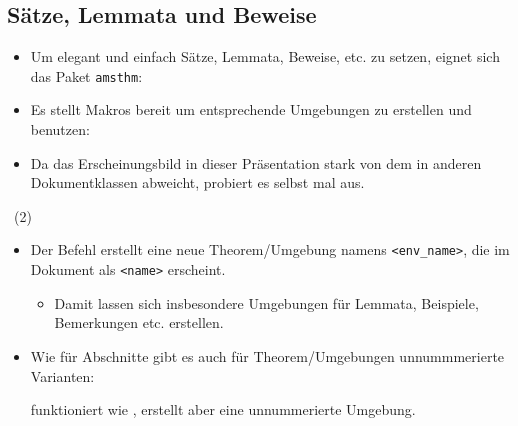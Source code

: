 \subsection{Sätze, Lemmata und Beweise}

\begin{frame}{\subsecname}
    \begin{itemize}
        \item Um elegant und einfach Sätze, Lemmata, Beweise, etc. zu setzen, eignet sich das Paket
            \texttt{amsthm}:
            \begin{center}
            \end{center}
        \item Es stellt Makros bereit um entsprechende Umgebungen zu erstellen und benutzen:
        \item Da das Erscheinungsbild in dieser Präsentation stark von dem in anderen
            Dokumentklassen abweicht, probiert es selbst mal aus.
    \end{itemize}
\end{frame}

\begin{frame}{\subsecname~(2)}
    \begin{itemize}
        \item Der Befehl  erstellt eine neue
            Theorem\-/Umgebung namens \texttt{<env\_name>}, die im Dokument als \texttt{<name>}
            erscheint.
            \begin{itemize}
                \item Damit lassen sich insbesondere Umgebungen für Lemmata, Beispiele, Bemerkungen
                    etc. erstellen.
            \end{itemize}
        \item Wie für Abschnitte gibt es auch für Theorem\-/Umgebungen unnummmerierte Varianten:
            \begin{center}
            \end{center}
            funktioniert wie \code{\\newtheorem}, erstellt aber eine unnummerierte Umgebung.
    \end{itemize}
\end{frame}
